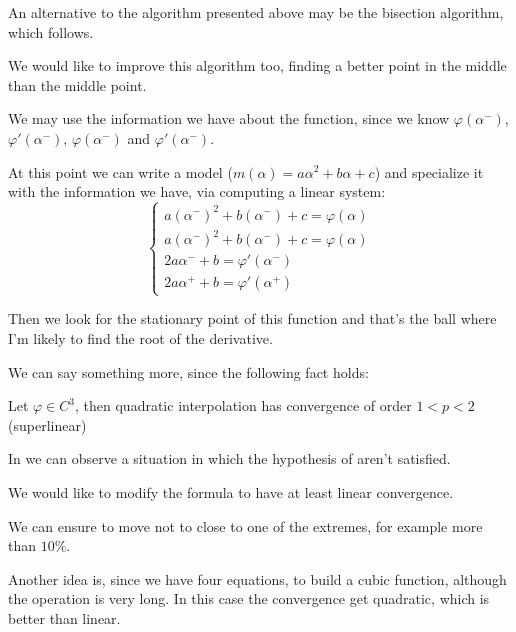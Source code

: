 \documentclass[computationalMathematics.tex]{subfiles}
\begin{document}
An alternative to the algorithm presented above may be the bisection algorithm, which follows.



We would like to improve this algorithm too, finding a better point in the middle than the middle point.


We may use the information we have about the function, since we know $\varphi(\alpha^{-})$, $\varphi ' (\alpha^{-})$, $\varphi(\alpha^{-})$ and $\varphi ' (\alpha^{-})$.

At this point we can write a model ($m(\alpha) = a {\alpha}^{2} + b \alpha + c$) and specialize it with the information we have, via computing a linear system:
\[
\begin{cases}
  a {(\alpha^{-})}^{2} + b (\alpha^{-}) + c = \varphi(\alpha)\\
  a {(\alpha^{-})}^{2} + b (\alpha^{-}) + c = \varphi(\alpha)\\
  2a \alpha^{-} + b = \varphi'(\alpha^{-})\\
  2a \alpha^{+} + b = \varphi'(\alpha^{+})
\end{cases}
\]

Then we look for the stationary point of this function and that's the ball where I'm likely to find the root of the derivative.

We can say something more, since the following fact holds:

\begin{proposition}\label{fact:24ott3}
Let $\varphi \in C^{{3}}$, then quadratic interpolation has convergence of order $1 < p < 2$ (superlinear)
\end{proposition}

In  we can observe a situation in which the hypothesis of  aren't satisfied.


We would like to modify the formula to have at least linear convergence.

We can ensure to move not to close to one of the extremes, for example more than $10\%$.

Another idea is, since we have four equations, to build a cubic function, although the operation is very long. In this case the convergence get quadratic, which is better than linear.
\end{document}
